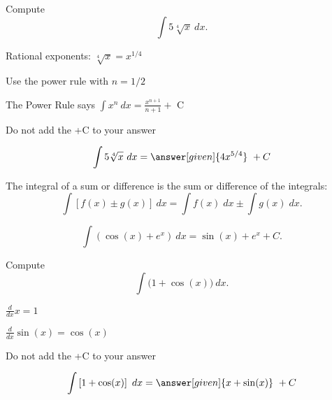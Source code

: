 \documentclass{ximera}
\begin{document}
\begin{problem} %
Compute 
\[
\int 5\sqrt[4]x \ dx.
\]

\begin{hint}
Rational exponents: $\sqrt[4]x = x^{1/4}$
\end{hint}
\begin{hint}
Use the power rule with $n=1/2$
\end{hint}
\begin{hint}
The Power Rule says $\int x^n \ dx = \frac{x^{n+1}}{n+1} +$ C
\end{hint}
\begin{hint}
\begin{center}
Do not add the +C to your answer
\end{center}
\end{hint}

\[
\int 5\sqrt[4]x \ dx =
\answer[given]{4x^{5/4}} \ + C
\]
\end{problem}



\begin{theorem}
The integral of a sum or difference is the sum or difference of the integrals:
\[
\int \left[f(x)\pm g(x)\right] \ dx = \int f(x) \; dx  \pm  \int g(x) \; dx.
\]
\end{theorem}



\begin{example} %
\[
\int \left(\cos(x) + e^x\right) \ dx = \sin(x) + e^x + C.
\]
\end{example}

\begin{problem} %
Compute
\[
\int \big(1 + \cos(x) \big) \ dx.
\]

\begin{hint}
$\frac{d}{dx} x = 1$
\end{hint}
\begin{hint}
$\frac{d}{dx} \sin(x) = \cos(x)$
\end{hint}
\begin{hint}
\begin{center}
Do not add the +C to your answer
\end{center}
\end{hint}

\[
\int \left[1 + \cos(x) \right] \ dx =
\answer[given]{x + \sin(x)} \ +  C
\]
\end{problem}
\end{document}
